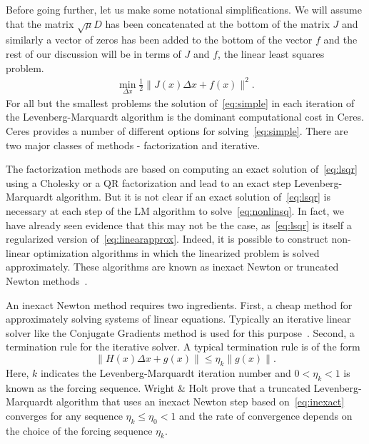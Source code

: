 Before going further, let us make some notational simplifications. We will assume that the matrix $\sqrt{\mu} D$ has been concatenated at the bottom of the matrix $J$ and similarly a vector of zeros has been added to the bottom of the vector $f$ and the rest of our discussion will be in terms of $J$ and $f$, \ie the linear least squares problem.
\begin{align}
 \min_{\Delta x} \frac{1}{2} \|J(x)\Delta x + f(x)\|^2 .
 \label{eq:simple}
\end{align}
For all but the smallest problems the solution of~\eqref{eq:simple} in each iteration of the Levenberg-Marquardt algorithm is the dominant computational cost in Ceres. Ceres provides a number of different options for solving~\eqref{eq:simple}. There are two major classes of methods - factorization and iterative.

The factorization methods are based on computing an exact solution of~\eqref{eq:lsqr} using a Cholesky or a QR factorization and lead to an exact step Levenberg-Marquardt algorithm. But it is not clear if an exact solution of~\eqref{eq:lsqr} is necessary at each step of the LM algorithm to solve~\eqref{eq:nonlinsq}. In fact, we have already seen evidence that this may not be the case, as~\eqref{eq:lsqr} is itself a regularized version of~\eqref{eq:linearapprox}. Indeed, it is possible to construct non-linear optimization algorithms in which the linearized problem is solved approximately. These algorithms are known as inexact Newton or truncated Newton methods~\cite{nocedal2000numerical}.

An inexact Newton method requires two ingredients. First, a cheap method for approximately solving systems of linear equations. Typically an iterative linear solver like the Conjugate Gradients method is used for this purpose~\cite{nocedal2000numerical}. Second, a termination rule for the iterative solver. A typical termination rule is of the form
\begin{equation}
        \|H(x) \Delta x + g(x)\| \leq \eta_k \|g(x)\|. \label{eq:inexact}
\end{equation}
Here, $k$ indicates the Levenberg-Marquardt iteration number and $0 < \eta_k <1$ is known as the forcing sequence.  Wright \& Holt \cite{wright1985inexact} prove that a truncated Levenberg-Marquardt algorithm that uses an inexact Newton step based on~\eqref{eq:inexact} converges for any sequence $\eta_k \leq \eta_0 < 1$ and the rate of convergence depends on the choice of the forcing sequence $\eta_k$.

